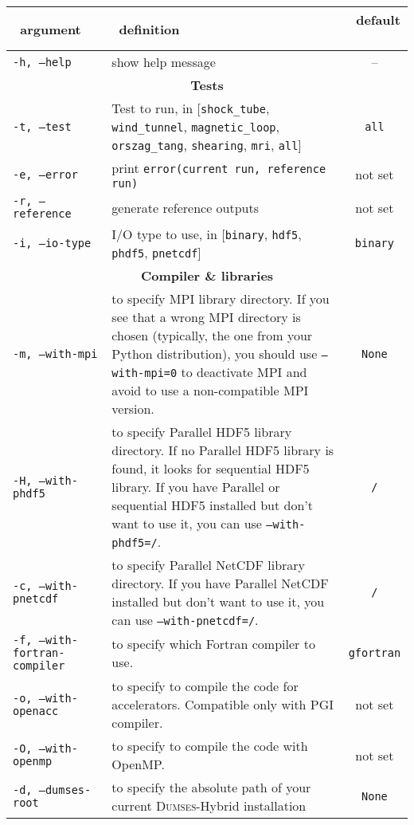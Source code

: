 \documentclass[a4paper,12pt]{article}
\begin{document}
\begin{table}[h!]
  \centering
  {\footnotesize
    \begin{tabular}{l | p{} | c }
      ~\hfill argument\hfill~ & ~\hfill definition\hfill~ & ~\hfill default \hfill~ \\
      \hline
      \hline
      \texttt{-h, --help} & show help message & -- \\
      \hline
      \multicolumn{3}{c}{\normalsize \bfseries Tests} \\
      \hline
      \texttt{-t, --test} & Test to run, in [\texttt{shock\_tube}, \texttt{wind\_tunnel}, \texttt{magnetic\_loop}, \texttt{orszag\_tang}, \texttt{shearing}, \texttt{mri}, \texttt{all}] & \texttt{all} \\
      \texttt{-e, --error} & print \texttt{error(current run, reference run)} & not set \\
      \texttt{-r, --reference} & generate reference outputs & not set \\
      \texttt{-i, --io-type} & I/O type to use, in [\texttt{binary}, \texttt{hdf5}, \texttt{phdf5}, \texttt{pnetcdf}] & \texttt{binary} \\
      \hline
      \multicolumn{3}{c}{\normalsize \bfseries Compiler \& libraries} \\
      \hline
      \texttt{-m, --with-mpi} & to specify MPI library directory. If you see that a wrong MPI directory is chosen (typically, the one from your Python distribution), you should use \texttt{--with-mpi=0} to deactivate MPI and avoid to use a non-compatible MPI version. & \texttt{None} \\
      \texttt{-H, --with-phdf5} & to specify Parallel HDF5 library directory. If no Parallel HDF5 library is found, it looks for sequential HDF5 library. If you have Parallel or sequential HDF5 installed but don't want to use it, you can use \texttt{--with-phdf5=/}. & \texttt{/} \\
      \texttt{-c, --with-pnetcdf} & to specify Parallel NetCDF library directory. If you have Parallel NetCDF installed but don't want to use it, you can use \texttt{--with-pnetcdf=/}. & \texttt{/} \\
      \texttt{-f, --with-fortran-compiler} & to specify which Fortran compiler to use. & \texttt{gfortran} \\
      \texttt{-o, --with-openacc} & to specify to compile the code for accelerators. Compatible only with PGI compiler. & not set \\
      \texttt{-O, --with-openmp} & to specify to compile the code with OpenMP. & not set \\
      \texttt{-d, --dumses-root} & to specify the absolute path of your current \textsc{Dumses}-Hybrid installation & \texttt{None} \\
      \hline
    \end{tabular}
  }
\end{table}
\end{document}
